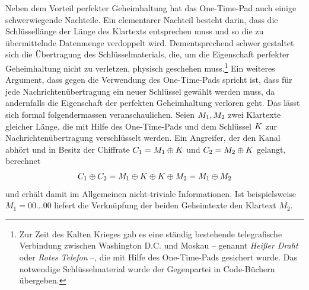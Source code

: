 
Neben dem Vorteil perfekter Geheimhaltung hat das One-Time-Pad auch einige schwerwiegende Nachteile. Ein elementarer Nachteil besteht darin, dass die Schlüssellänge der Länge des Klartexts entsprechen muss und so die zu übermittelnde Datenmenge verdoppelt wird. Dementsprechend schwer gestaltet sich die Übertragung des Schlüsselmaterials, die, um die Eigenschaft perfekter Geheimhaltung nicht zu verletzen, physisch geschehen muss.\footnote{Zur Zeit des Kalten Krieges gab es eine ständig bestehende telegrafische Verbindung zwischen Washington D.C. und Moskau -- genannt \emph{Heißer Draht} oder \emph{Rotes Telefon} --, die mit Hilfe des One-Time-Pads gesichert wurde. Das notwendige Schlüsselmaterial wurde der Gegenpartei in Code-Büchern übergeben.}
Ein weiteres Argument, dass gegen die Verwendung des One-Time-Pads spricht ist, dass für jede Nachrichtenübertragung ein neuer Schlüssel gewählt werden muss, da andernfalls die Eigenschaft der perfekten Geheimhaltung verloren geht. Das lässt sich formal folgendermassen veranschaulichen. Seien $M_{1}, M_{2}$ zwei Klartexte gleicher Länge, die mit Hilfe des One-Time-Pads und dem Schlüssel $K$ zur Nachrichtenübertragung verschlüsselt werden. Ein Angreifer, der den Kanal abhört und in Besitz der Chiffrate $C_{1} = M_{1} \oplus K$ und $C_{2} = M_{2} \oplus K$ gelangt, berechnet
\begin{align*}
	C_{1} \oplus C_{2} = M_{1} \oplus K \oplus K \oplus M_{2} = M_{1} \oplus M_{2}
\end{align*}
und erhält damit im Allgemeinen nicht-triviale Informationen. Ist beispielsweise $M_{1} = 00\dots00$ liefert die Verknüpfung der beiden Geheimtexte den Klartext $M_{2}$. 

